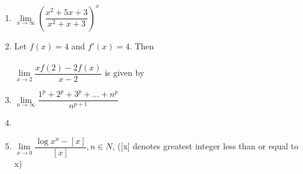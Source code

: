 \begin{enumerate}[label=\arabic*.,ref=\thesubsection.\theenumi]
\item $\lim\limits_{x \to \infty}\left(\dfrac{x^2+5x+3}{x^2+x+3}\right)^x$
\begin{itemize}
\end{itemize}

\item Let $f(x)=4$ and $f'(x)=4$. Then\\ \\ $\lim\limits_{x \to 2}\dfrac{xf(2)-2f(x)}{x-2}$ is given by
\begin{itemize}
\end{itemize}

\item$\lim\limits_{n \to \infty}\dfrac{1^p+2^p+3^p+...+n^p}{n^{p+1}}$
\begin{itemize}
\end{itemize}

\item[~] \item $\lim\limits_{x \to 0}\dfrac{\log x^n-[x]}{[x]}, n \in N$, ([x] denotes greatest integer less than or equal to x)
\begin{itemize}
\end{itemize}


\end{enumerate}
